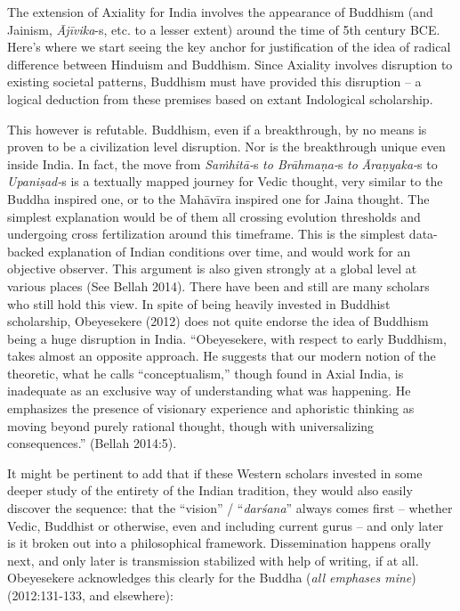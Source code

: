 The extension of Axiality for India involves the appearance of Buddhism (and Jainism, \textit{Ājīvika}-s, etc. to a lesser extent) around the time of 5th century BCE. Here’s where we start seeing the key anchor for justification of the idea of radical difference between Hinduism and Buddhism. Since Axiality involves disruption to existing societal patterns, Buddhism must have provided this disruption – a logical deduction from these premises based on extant Indological scholarship.

This however is refutable. Buddhism, even if a breakthrough, by no means is proven to be a civilization level disruption. Nor is the breakthrough unique even inside India. In fact, the move from \textit{Saṁhitā-}s\textit{ to Brāhmaṇa-}s\textit{ to} \textit{Āraṇyaka-}s to \textit{Upaniṣad-}s is a textually mapped journey for Vedic thought, very similar to the Buddha inspired one, or to the Mahāvīra inspired one for Jaina thought. The simplest explanation would be of them all crossing evolution thresholds and undergoing cross fertilization around this timeframe. This is the simplest data-backed explanation of Indian conditions over time, and would work for an objective observer. This argument is also given strongly at a global level at various places (See Bellah 2014). There have been and still are many scholars who still hold this view. In spite of being heavily invested in Buddhist scholarship, Obeyesekere (2012) does not quite endorse the idea of Buddhism being a huge disruption in India. “Obeyesekere, with respect to early Buddhism, takes almost an opposite approach. He suggests that our modern notion of the theoretic, what he calls “conceptualism,” though found in Axial India, is inadequate as an exclusive way of understanding what was happening. He emphasizes the presence of visionary experience and aphoristic thinking as moving beyond purely rational thought, though with universalizing consequences.” (Bellah 2014:5).

It might be pertinent to add that if these Western scholars invested in some deeper study of the entirety of the Indian tradition, they would also easily discover the sequence: that the “vision” / “\textit{darśana}” always comes first – whether Vedic, Buddhist or otherwise, even and including current gurus – and only later is it broken out into a philosophical framework. Dissemination happens orally next, and only later is transmission stabilized with help of writing, if at all. Obeyesekere acknowledges this clearly for the Buddha (\textit{all emphases mine}) (2012:131-133, and elsewhere):

